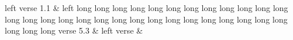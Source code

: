 \documentclass{book}
\begin{document}
    \beginnumbering
    \stanza
    left verse 1.1 &
    \skipnumbering left long long long long long long long long long long long long long long long long long long long long long long long long long long long long long long long verse 5.3 &
    left verse \&

    \endnumbering
\end{document}
